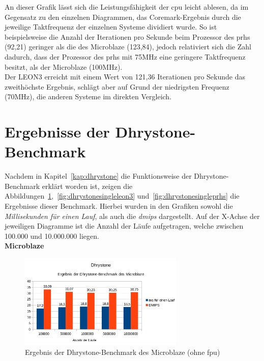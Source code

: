 An dieser Grafik lässt sich die Leistungsfähigkeit der \ac{cpu} leicht ablesen, da im Gegensatz zu den einzelnen Diagrammen, das Coremark-Ergebnis durch die jeweilige Taktfrequenz der
einzelnen Systeme dividiert wurde. So ist beispielsweise die Anzahl der Iterationen pro Sekunde beim Prozessor des \ac{prhs} (92,21) geringer als die des Microblaze (123,84), jedoch
relativiert sich die Zahl dadurch, dass der Prozessor des \ac{prhs} mit 75MHz eine geringere Taktfrequenz besitzt, als der Microblaze (100MHz). \\
Der LEON3 erreicht mit einem Wert von 121,36 Iterationen pro Sekunde das zweithöchste Ergebnis, schlägt aber auf Grund der niedrigsten Frequenz (70MHz), die anderen Systeme im direkten Vergleich.\\

\section{Ergebnisse der Dhrystone-Benchmark}\label{kap:dhrystonetest}

Nachdem in Kapitel~\ref{kap:dhrystone} die Funktionsweise der Dhrystone-Benchmark erklärt worden ist, zeigen die Abbildungen~\ref{fig:dhrystonembohnefpu},~\ref{fig:dhrystonesingleleon3} und~\ref{fig:dhrystonesingleprhs} die Ergebnisse
dieser Benchmark. Hierbei wurden in den Grafiken sowohl die \emph{Millisekunden für einen Lauf}, als auch die \emph{\ac{dmips}} dargestellt. Auf der X-Achse der jeweiligen Diagramme ist die Anzahl
der Läufe aufgetragen, welche zwischen 100.000 und 10.000.000 liegen.\\

\textbf{Microblaze}

\begin{figure}[H]
\centering
\includegraphics[width=0.7\textwidth]{Hauptteil/dhrystonembohnefpu.png}
\caption{Ergebnis der Dhrystone-Benchmark des Microblaze (ohne \ac{fpu})}
\label{fig:dhrystonembohnefpu}
\end{figure}


